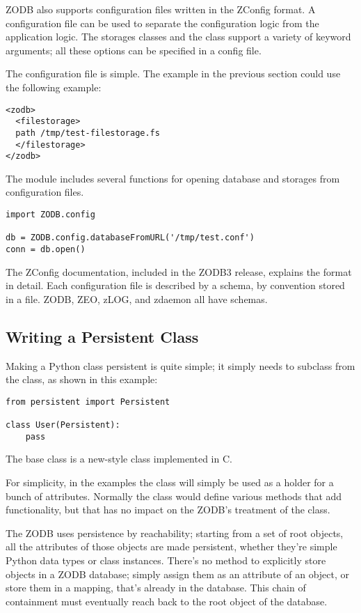 ZODB also supports configuration files written in the ZConfig format.
A configuration file can be used to separate the configuration logic
from the application logic.  The storages classes and the 
class support a variety of keyword arguments; all these options can be
specified in a config file.

The configuration file is simple.  The example in the previous section
could use the following example:

\begin{verbatim}
<zodb>
  <filestorage>
  path /tmp/test-filestorage.fs
  </filestorage>
</zodb>
\end{verbatim}

The  module includes several functions for opening
database and storages from configuration files.

\begin{verbatim}
import ZODB.config

db = ZODB.config.databaseFromURL('/tmp/test.conf')
conn = db.open()
\end{verbatim}

The ZConfig documentation, included in the ZODB3 release, explains
the format in detail.  Each configuration file is described by a
schema, by convention stored in a  file.  ZODB,
ZEO, zLOG, and zdaemon all have schemas.

\subsection{Writing a Persistent Class}

Making a Python class persistent is quite simple; it simply needs to
subclass from the  class, as shown in this example:

\begin{verbatim}
from persistent import Persistent

class User(Persistent):
    pass
\end{verbatim}

The  base class is a new-style class implemented in
C.

For simplicity, in the examples the  class will
simply be used as a holder for a bunch of attributes.  Normally the
class would define various methods that add functionality, but that
has no impact on the ZODB's treatment of the class.

The ZODB uses persistence by reachability; starting from a set of root
objects, all the attributes of those objects are made persistent,
whether they're simple Python data types or class instances.  There's
no method to explicitly store objects in a ZODB database; simply
assign them as an attribute of an object, or store them in a mapping,
that's already in the database.  This chain of containment must
eventually reach back to the root object of the database.

